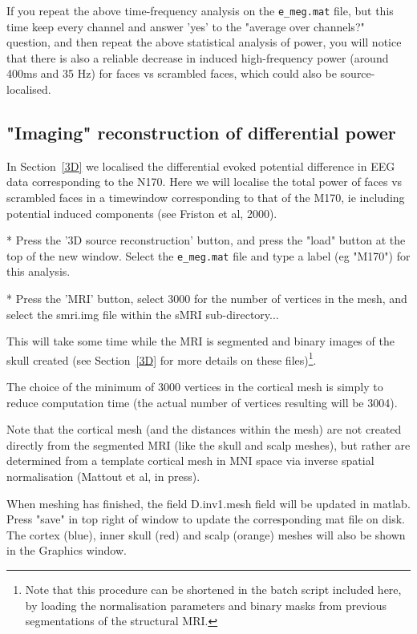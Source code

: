 If you repeat the above time-frequency analysis on the \verb!e_meg.mat! file, but this time keep every channel and answer 'yes' to the "average over channels?" question, and then repeat the above statistical analysis of power, you will notice that there is also a reliable decrease in induced high-frequency power (around 400ms and 35 Hz) for faces vs scrambled faces, which could also be source-localised.


\subsection{"Imaging" reconstruction of differential power}

In Section~\ref{3D} we localised the differential evoked potential difference in EEG data corresponding to the N170.  Here we will localise the total power of faces vs scrambled faces in a timewindow corresponding to that of the M170, ie including potential induced components (see Friston et al, 2000).

* Press the '3D source reconstruction' button, and press the "load" button at the top of the new window. Select the \verb!e_meg.mat! file and type a label (eg "M170") for this analysis.

* Press the 'MRI' button, select 3000 for the number of vertices in the mesh, and select the smri.img file within the sMRI sub-directory...

This will take some time while the MRI is segmented and binary images of the skull created (see Section~\ref{3D} for more details on these files)\footnote{Note that this procedure can be shortened in the batch script included here, by loading the normalisation parameters and binary masks from previous segmentations of the structural MRI.}.

The choice of the minimum of 3000 vertices in the cortical mesh is simply to reduce computation time (the actual number of vertices resulting will be 3004).

Note that the cortical mesh (and the distances within the mesh) are not created directly from the segmented MRI (like the skull and scalp meshes), but rather are determined from a template cortical mesh in MNI space via inverse spatial normalisation (Mattout et al, in press).

When meshing has finished, the field D.inv{1}.mesh field will be updated in matlab. Press "save" in top right of window to update the corresponding mat file on disk. The cortex (blue), inner skull (red) and scalp (orange) meshes will also be shown in the Graphics window.

